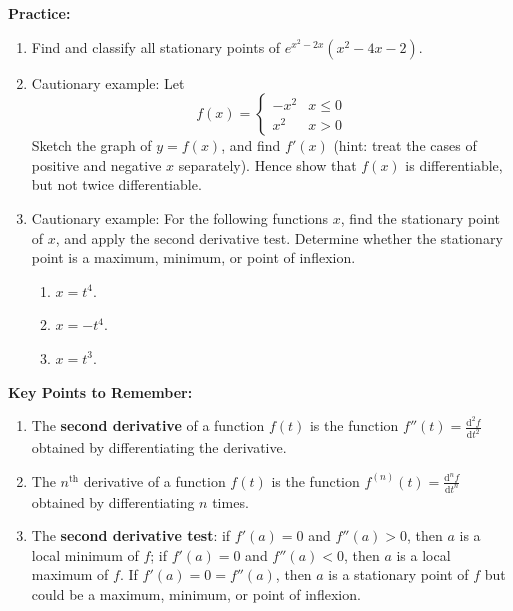 \documentclass{article}
\newcommand{\deriv}[3][]{\frac{\mathrm{d}^{#1} #2}{\mathrm{d}#3^{#1}}}
\begin{document}
\textbf{Practice:}


\begin{enumerate}
	\item Find and classify all stationary points of $e^{x^2-2x}(x^2-4x-2)$.
	\item Cautionary example: Let 
		\[f(x)=\begin{cases}
				-x^2 & x\leq 0\\
				x^2 & x>0
			\end{cases}\]
		Sketch the graph of $y=f(x)$, and find $f'(x)$ (hint: treat the cases of positive and negative $x$ separately). Hence show that $f(x)$ is differentiable, but not twice differentiable.
	\item Cautionary example: For the following functions $x$, find the stationary point of $x$, and apply the second derivative test. Determine whether the stationary point is a maximum, minimum, or point of inflexion.
		\begin{enumerate}
			\item $x=t^4$.
			\item $x=-t^4$.
			\item $x=t^3$.
		\end{enumerate}
\end{enumerate}





\clearpage




{\bf Key Points to Remember:}

\vspace{5mm}

\begin{enumerate}
	\item The \textbf{second derivative} of a function $f(t)$ is the function $f''(t)=\deriv[2]{f}{t}$ obtained by differentiating the derivative.
	\item The $n^\mathrm{th}$ derivative of a function $f(t)$ is the function $f^{(n)}(t)=\deriv[n]{f}{t}$ obtained by differentiating $n$ times.
	\item The \textbf{second derivative test}: if $f'(a)=0$ and $f''(a)>0$, then $a$ is a local minimum of $f$; if $f'(a)=0$ and $f''(a)<0$, then $a$ is a local maximum of $f$. If $f'(a)=0=f''(a)$, then $a$ is a stationary point of $f$ but could be a maximum, minimum, or point of inflexion.
\end{enumerate}
\end{document}
